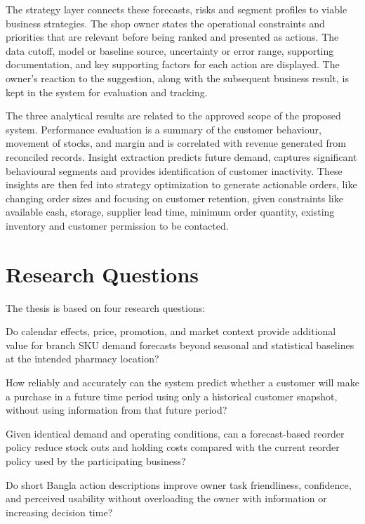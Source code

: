\documentclass[a4paper,11pt,oneside]{book}
\theoremstyle{plain}
\theoremstyle{definition}
\theoremstyle{remark}
\begin{document}
The strategy layer connects these forecasts, risks and segment profiles to viable business strategies. The shop owner states the operational constraints and priorities that are relevant before being ranked and presented as actions. The data cutoff, model or baseline source, uncertainty or error range, supporting documentation, and key supporting factors for each action are displayed. The owner's reaction to the suggestion, along with the subsequent business result, is kept in the system for evaluation and tracking.

The three analytical results are related to the approved scope of the proposed system. Performance evaluation is a summary of the customer behaviour, movement of stocks, and margin and is correlated with revenue generated from reconciled records. Insight extraction predicts future demand, captures significant behavioural segments and provides identification of customer inactivity. These insights are then fed into strategy optimization to generate actionable orders, like changing order sizes and focusing on customer retention, given constraints like available cash, storage, supplier lead time, minimum order quantity, existing inventory and customer permission to be contacted.



\section{Research Questions}

The thesis is based on four research questions:

\begin{description}[style=nextline,leftmargin=2em]

\item[RQ1.] Do calendar effects, price, promotion, and market context provide additional value for branch SKU demand forecasts beyond seasonal and statistical baselines at the intended pharmacy location?

\item[RQ2.] How reliably and accurately can the system predict whether a customer will make a purchase in a future time period using only a historical customer snapshot, without using information from that future period?

\item[RQ3.]Given identical demand and operating conditions, can a forecast-based reorder policy reduce stock outs and holding costs compared with the current reorder policy used by the participating business?

\item[RQ4.] Do short Bangla action descriptions improve owner task friendliness, confidence, and perceived usability without overloading the owner with information or increasing decision time?

\end{description}
\end{document}
